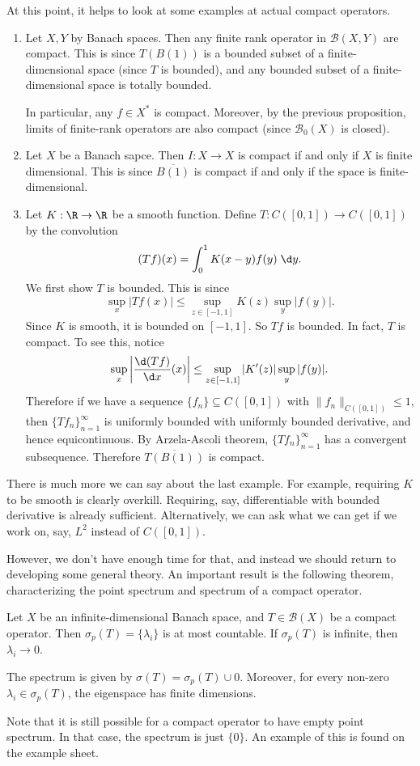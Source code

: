 \documentclass[a4paper]{article}
\begin{document}
At this point, it helps to look at some examples at actual compact operators.
\begin{eg}\leavevmode
  \begin{enumerate}
    \item Let $X, Y$ by Banach spaces. Then any finite rank operator in $\mathcal{B}(X, Y)$ are compact. This is since $T(B(1))$ is a bounded subset of a finite-dimensional space (since $T$ is bounded), and any bounded subset of a finite-dimensional space is totally bounded.

      In particular, any $f \in X^*$ is compact. Moreover, by the previous proposition, limits of finite-rank operators are also compact (since $\mathcal{B}_0(X)$ is closed).
    \item Let $X$ be a Banach sapce. Then $I: X \to X$ is compact if and only if $X$ is finite dimensional. This is since $\overline{B(1)}$ is compact if and only if the space is finite-dimensional.
    \item Let $K: \R \to \R$ be a smooth function. Define $T: C([0, 1]) \to C([0, 1])$ by the convolution
      \[
        (T f)(x) = \int_0^1 K(x - y) f(y)\;\d y.
      \]
    We first show $T$ is bounded. This is since
    \[
      \sup_x |T f(x)| \leq \sup_{z \in [-1, 1]} K(z) \sup_y |f(y)|.
    \]
    Since $K$ is smooth, it is bounded on $[-1, 1]$. So $Tf$ is bounded. In fact, $T$ is compact. To see this, notice
    \[
      \sup_x \left|\frac{\d (Tf)}{\d x}(x)\right| \leq \sup_{z \in [-1, 1]} |K'(z)| \sup_y |f(y)|.
    \]
    Therefore if we have a sequence $\{f_n\} \subseteq C([0, 1])$ with $\|f_n\|_{C([0, 1])} \leq 1$, then $\{T f_n\}_{n = 1}^\infty$ is uniformly bounded with uniformly bounded derivative, and hence equicontinuous. By Arzela-Ascoli theorem, $\{T f_n\}_{n = 1}^\infty$ has a convergent subsequence. Therefore $\overline{T(B(1))}$ is compact.
  \end{enumerate}
\end{eg}
There is much more we can say about the last example. For example, requiring $K$ to be smooth is clearly overkill. Requiring, say, differentiable with bounded derivative is already sufficient. Alternatively, we can ask what we can get if we work on, say, $L^2$ instead of $C([0, 1])$.

However, we don't have enough time for that, and instead we should return to developing some general theory. An important result is the following theorem, characterizing the point spectrum and spectrum of a compact operator.
\begin{thm}
  Let $X$ be an infinite-dimensional Banach space, and $T \in \mathcal{B}(X)$ be a compact operator. Then $\sigma_p(T) = \{\lambda_i\}$ is at most countable. If $\sigma_p(T)$ is infinite, then $\lambda_i \to 0$.

  The spectrum is given by $\sigma(T) = \sigma_p(T) \cup 0$. Moreover, for every non-zero $\lambda_i \in \sigma_p (T)$, the eigenspace has finite dimensions.
\end{thm}
Note that it is still possible for a compact operator to have empty point spectrum. In that case, the spectrum is just $\{0\}$. An example of this is found on the example sheet.
\end{document}
